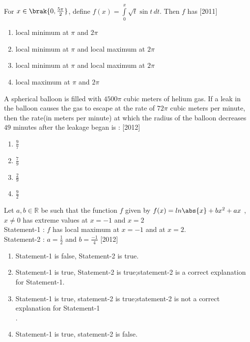 \iffalse
\title{16. Applications of derivatives}
\author{Akhilesh-EE24BTECH11066}
\section{mcq-single}
\fi
\item For $x \in \brak{0, \frac{5\pi}{2}}$, define $f(x)=\int\limits_0^x\sqrt{t}\sin t \, dt$. Then $f$ has \hfill{[2011]}\\
\begin{enumerate}
    \item   local minimum at $\pi$ and $2\pi$\\
    \item   local minimum at $\pi$ and local maximum at $2\pi$
    \item   local minimum at $\pi$ and local maximum at $2\pi$
    \item   local maximum at $\pi$ and $2\pi$\\
\end{enumerate}
    
\item A spherical balloon is filled with $4500\pi$ cubic meters of helium gas. If a leak in the balloon causes the gas to escape at the rate of $72\pi$ cubic meters per minute, then the rate{(in meters per minute)} at which the radius of the balloon decreases $49$ minutes after the leakage began is : \hfill{[2012]}\\
\begin{enumerate}
    \item   $\frac{9}{7}$\\
    \item   $\frac{7}{9}$\\
    \item   $\frac{2}{9}$\\
    \item   $\frac{9}{2}$\\
\end{enumerate} 

\item Let $a, b\in \mathbb R$ be such that the function $f$ given by $f(x)=ln\abs{x}+bx^{2}+ax$ , 
$x \neq 0$ has extreme values at $x=-1$ and $x=2$\\
Statement-1 : $f$ has local maximum at $x=-1$ and at $x=2$.\\
Statement-2 : $a=\frac{1}{2}$ and $b=\frac{-1}{4}$ \hfill{[2012]}\\
\begin{enumerate}
    \item Statement-1 is false, Statement-2 is true.\\
    \item Statement-1 is true, Statement-2 is true;statement-2 is a correct explanation for Statement-1.\\
    \item Statement-1 is true, statement-2 is true;statement-2 is not a correct explanation for Statement-1\\.
    \item Statement-1 is true, statement-2 is false.\\
\end{enumerate}

